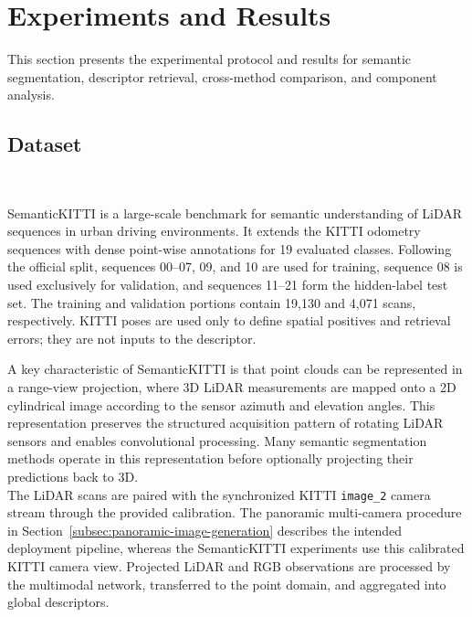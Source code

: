 \section{Experiments and Results} \label{sec:results}

This section presents the experimental protocol and results for semantic segmentation, descriptor retrieval, cross-method comparison, and component analysis.

\subsection{Dataset}~\label{subsec:dataset}

SemanticKITTI is a large-scale benchmark for semantic understanding of LiDAR sequences in urban driving environments. It extends the KITTI odometry sequences with dense point-wise annotations for 19 evaluated classes. Following the official split, sequences 00--07, 09, and 10 are used for training, sequence 08 is used exclusively for validation, and sequences 11--21 form the hidden-label test set. The training and validation portions contain 19,130 and 4,071 scans, respectively. KITTI poses are used only to define spatial positives and retrieval errors; they are not inputs to the descriptor.

A key characteristic of SemanticKITTI is that point clouds can be represented in a range-view projection, where 3D LiDAR measurements are mapped onto a 2D cylindrical image according to the sensor azimuth and elevation angles. This representation preserves the structured acquisition pattern of rotating LiDAR sensors and enables convolutional processing. Many semantic segmentation methods operate in this representation before optionally projecting their predictions back to 3D. \\

The LiDAR scans are paired with the synchronized KITTI \texttt{image\_2} camera stream through the provided calibration. The panoramic multi-camera procedure in Section~\ref{subsec:panoramic-image-generation} describes the intended deployment pipeline, whereas the SemanticKITTI experiments use this calibrated KITTI camera view. Projected LiDAR and RGB observations are processed by the multimodal network, transferred to the point domain, and aggregated into global descriptors.

